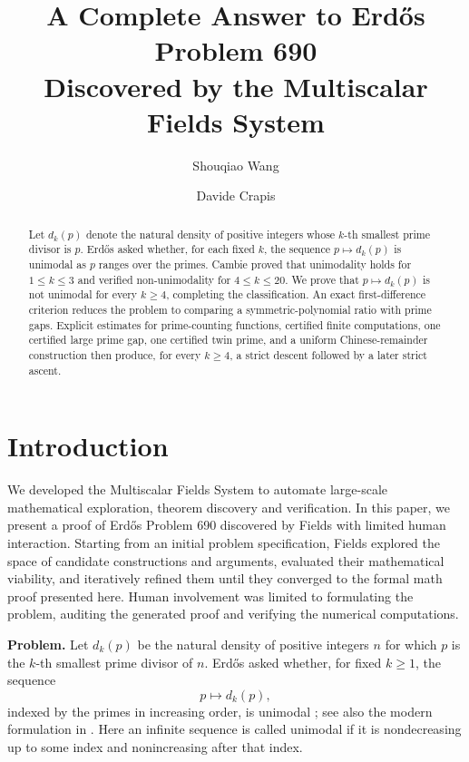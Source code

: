 \documentclass[11pt]{article}
\title{
A Complete Answer to Erdős Problem 690\\
{\large Discovered by the Multiscalar Fields System}
}
\author{Shouqiao Wang}
\author{Davide Crapis}
\affil{Multiscalar Intelligence}
\date{}
\numberwithin{equation}{section}
\theoremstyle{plain}
\theoremstyle{definition}
\theoremstyle{remark}
\begin{document}
\maketitle

\begin{abstract}
Let \(d_k(p)\) denote the natural density of positive integers whose \(k\)-th smallest prime divisor is \(p\).  Erd\H{o}s asked whether, for each fixed \(k\), the sequence \(p\mapsto d_k(p)\) is unimodal as \(p\) ranges over the primes.  Cambie proved that unimodality holds for \(1\le k\le3\) and verified non-unimodality for \(4\le k\le20\).  We prove that \(p\mapsto d_k(p)\) is not unimodal for every \(k\ge4\), completing the classification. An exact first-difference criterion reduces the problem to comparing a symmetric-polynomial ratio with prime gaps.  Explicit estimates for prime-counting functions, certified finite computations, one certified large prime gap, one certified twin prime, and a uniform Chinese-remainder construction then produce, for every \(k\ge4\), a strict descent followed by a later strict ascent.
\end{abstract}

\section{Introduction}

We developed the Multiscalar Fields System to automate large-scale mathematical exploration, theorem discovery and verification. In this paper, we present a proof of Erd\H{o}s Problem 690 discovered by Fields with limited human interaction. Starting from an initial problem specification, Fields explored the space of candidate constructions and arguments, evaluated their mathematical viability, and iteratively refined them until they converged to the formal math proof presented here. Human involvement was limited to formulating the problem, auditing the generated proof and verifying the numerical computations.

\medskip
\noindent \textbf{Problem.}
Let \(d_k(p)\) be the natural density of positive integers \(n\) for which \(p\) is the \(k\)-th smallest prime divisor of \(n\).  Erd\H{o}s asked whether, for fixed \(k\ge1\), the sequence
\[
        p\longmapsto d_k(p),
\]
indexed by the primes in increasing order, is unimodal \cite{Erdos1979}; see also the modern formulation in \cite{Bloom690}.  Here an infinite sequence is called unimodal if it is nondecreasing up to some index and nonincreasing after that index.
\end{document}
